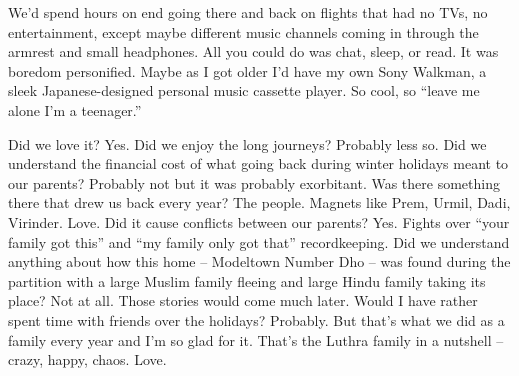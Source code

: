 We’d spend hours on end going there and back on flights that had no TVs, no entertainment, except maybe different music channels coming in through the armrest and small headphones. All you could do was chat, sleep, or read. It was boredom personified. Maybe as I got older I’d have my own Sony Walkman, a sleek Japanese-designed personal music cassette player. So cool, so “leave me alone I’m a teenager.”

Did we love it? Yes. Did we enjoy the long journeys? Probably less so. Did we understand the financial cost of what going back during winter holidays meant to our parents? Probably not but it was probably exorbitant. Was there something there that drew us back every year? The people. Magnets like Prem, Urmil, Dadi, Virinder. Love. Did it cause conflicts between our parents? Yes. Fights over “your family got this” and “my family only got that” recordkeeping. Did we understand anything about how this home – Modeltown Number Dho – was found during the partition with a large Muslim family fleeing and large Hindu family taking its place? Not at all. Those stories would come much later. Would I have rather spent time with friends over the holidays? Probably. But that’s what we did as a family every year and I’m so glad for it. That’s the Luthra family in a nutshell – crazy, happy, chaos. Love.

